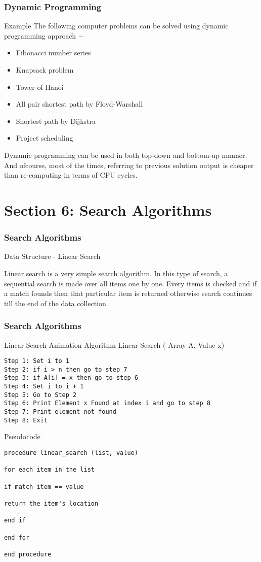 \documentclass{beamer}
\begin{document}
\begin{frame}
\frametitle{Dynamic Programming}
\large
Example
The following computer problems can be solved using dynamic programming approach −
\begin{itemize}
\item 
Fibonacci number series
\item Knapsack problem
\item Tower of Hanoi
\item All pair shortest path by Floyd-Warshall
\item Shortest path by Dijkstra
\item Project scheduling
\end{itemize}

Dynamic programming can be used in both top-down and bottom-up manner. And ofcourse, most of the times, referring to previous solution output is cheaper than re-computing in terms of CPU cycles.
 
\end{frame}
\section{Section 6: Search Algorithms}
\begin{frame}
\frametitle{Search Algorithms}
\large
Data Structure - Linear Search

Linear search is a very simple search algorithm. In this type of search, a sequential search is made over all items one by one. Every items is checked and if a match founds then that particular item is returned otherwise search continues till the end of the data collection.
\end{frame}

\begin{frame}[fragile]
\frametitle{Search Algorithms}
\large
Linear Search Animation
Algorithm
Linear Search ( Array A, Value x)
\begin{verbatim}
Step 1: Set i to 1
Step 2: if i > n then go to step 7
Step 3: if A[i] = x then go to step 6
Step 4: Set i to i + 1
Step 5: Go to Step 2
Step 6: Print Element x Found at index i and go to step 8
Step 7: Print element not found
Step 8: Exit
\end{verbatim}
\end{frame}

\begin{frame}[fragile]
Pseudocode
\begin{verbatim}
procedure linear_search (list, value)

for each item in the list

if match item == value

return the item's location

end if

end for

end procedure 
\end{verbatim}

\end{frame}
\end{document}
